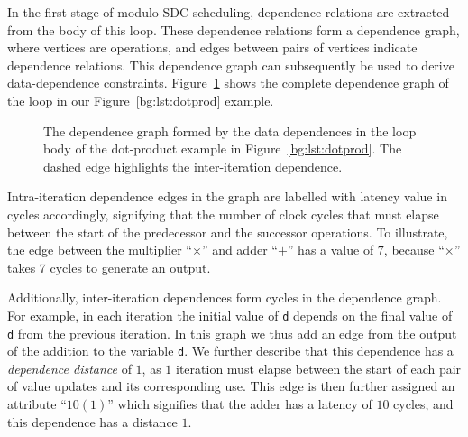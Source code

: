 In the first stage of modulo SDC scheduling, dependence relations are extracted
from the body of this loop.  These dependence relations form a dependence
graph, where vertices are operations, and edges between pairs of vertices
indicate dependence relations.  This dependence graph can subsequently be used
to derive data-dependence constraints.  Figure~\ref{bg:fig:depgraph} shows
the complete dependence graph of the loop in our Figure~\ref{bg:lst:dotprod}
example.
\begin{figure}[ht]
    \centering
    \caption{%
        The dependence graph formed by the data dependences in the loop body
        of the dot-product example in Figure~\ref{bg:lst:dotprod}.  The dashed
        edge highlights the inter-iteration dependence.
    }\label{bg:fig:depgraph}
\end{figure}

Intra-iteration dependence edges in the graph are labelled with latency value
in cycles accordingly, signifying that the number of clock cycles that must
elapse between the start of the predecessor and the successor operations.  To
illustrate, the edge between the multiplier ``$\times$'' and adder ``$+$'' has
a value of $7$, because ``$\times$'' takes 7 cycles to generate an output.

Additionally, inter-iteration dependences form cycles in the dependence graph.
For example, in each iteration the initial value of \verb|d| depends on the
final value of \verb|d| from the previous iteration.  In this graph we thus add
an edge from the output of the addition to the variable \verb|d|.  We further
describe that this dependence has a \emph{dependence distance} of $1$, as $1$
iteration must elapse between the start of each pair of value updates and its
corresponding use.  This edge is then further assigned an attribute ``$10
(1)$'' which signifies that the adder has a latency of $10$ cycles, and this
dependence has a distance $1$.


